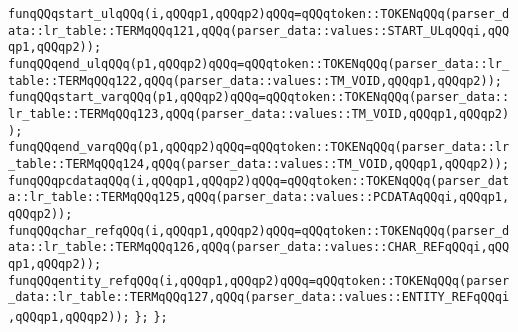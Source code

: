 \verb|funqQQqstart_ulqQQq(i,qQQqp1,qQQqp2)qQQq=qQQqtoken::TOKENqQQq(parser_data::lr_table::TERMqQQq121,qQQq(parser_data::values::START_ULqQQqi,qQQqp1,qQQqp2));|\newline
\verb|funqQQqend_ulqQQq(p1,qQQqp2)qQQq=qQQqtoken::TOKENqQQq(parser_data::lr_table::TERMqQQq122,qQQq(parser_data::values::TM_VOID,qQQqp1,qQQqp2));|\newline
\verb|funqQQqstart_varqQQq(p1,qQQqp2)qQQq=qQQqtoken::TOKENqQQq(parser_data::lr_table::TERMqQQq123,qQQq(parser_data::values::TM_VOID,qQQqp1,qQQqp2));|\newline
\verb|funqQQqend_varqQQq(p1,qQQqp2)qQQq=qQQqtoken::TOKENqQQq(parser_data::lr_table::TERMqQQq124,qQQq(parser_data::values::TM_VOID,qQQqp1,qQQqp2));|\newline
\verb|funqQQqpcdataqQQq(i,qQQqp1,qQQqp2)qQQq=qQQqtoken::TOKENqQQq(parser_data::lr_table::TERMqQQq125,qQQq(parser_data::values::PCDATAqQQqi,qQQqp1,qQQqp2));|\newline
\verb|funqQQqchar_refqQQq(i,qQQqp1,qQQqp2)qQQq=qQQqtoken::TOKENqQQq(parser_data::lr_table::TERMqQQq126,qQQq(parser_data::values::CHAR_REFqQQqi,qQQqp1,qQQqp2));|\newline
\verb|funqQQqentity_refqQQq(i,qQQqp1,qQQqp2)qQQq=qQQqtoken::TOKENqQQq(parser_data::lr_table::TERMqQQq127,qQQq(parser_data::values::ENTITY_REFqQQqi,qQQqp1,qQQqp2));|\newline
\verb|};|\newline
\verb|};|\newline

